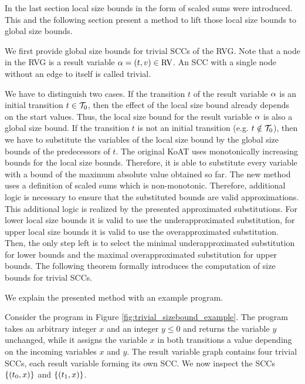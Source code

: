 In the last section local size bounds in the form of scaled sums were introduced.
This and the following section present a method to lift those local size bounds to global size bounds.

We first provide global size bounds for trivial SCCs of the RVG.
Note that a node in the RVG is a result variable $\alpha = (t,v) \in \text{RV}$.
An SCC with a single node without an edge to itself is called trivial.

We have to distinguish two cases.
If the transition $t$ of the result variable $\alpha$ is an initial transition $t \in \mathcal{T}_0$, then the effect of the local size bound already depends on the start values.
Thus, the local size bound for the result variable $\alpha$ is also a global size bound.
If the transition $t$ is not an initial transition (e.g. $t \notin \mathcal{T}_0$), then we have to substitute the variables of the local size bound by the global size bounds of the predecessors of $t$.
The original KoAT uses monotonically increasing bounds for the local size bounds.
Therefore, it is able to substitute every variable with a bound of the maximum absolute value obtained so far.
The new method uses a definition of scaled sums which is non-monotonic.
Therefore, additional logic is necessary to ensure that the substituted bounds are valid approximations.
This additional logic is realized by the presented approximated substitutions.
For lower local size bounds it is valid to use the underapproximated substitution, for upper local size bounds it is valid to use the overapproximated substitution.
Then, the only step left is to select the minimal underapproximated substitution for lower bounds and the maximal overapproximated substitution for upper bounds.
The following theorem formally introduces the computation of size bounds for trivial SCCs.



We explain the presented method with an example program.



Consider the program in Figure \ref{fig:trivial_sizebound_example}.
The program takes an arbitrary integer $x$ and an integer $y \leq 0$ and returns the variable $y$ unchanged, while it assigns the variable $x$ in both transitions a value depending on the incoming variables $x$ and $y$.
The result variable graph contains four trivial SCCs, each result variable forming its own SCC.
We now inspect the SCCs $\lbrace (t_0,x) \rbrace$ and $\lbrace (t_1,x) \rbrace$.
  

